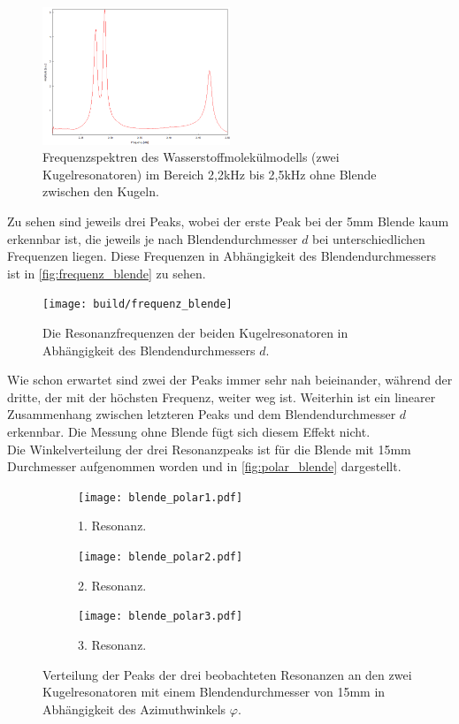 \begin{figure}
    \centering
    \includegraphics[width=0.5\textwidth]{data/3_1/ohne.png}
    \caption{Frequenzspektren des Wasserstoffmolekülmodells (zwei Kugelresonatoren) im Bereich 2,2\;kHz bis 2,5\;kHz ohne Blende zwischen den Kugeln.}
    \label{fig:ohne}
\end{figure}
Zu sehen sind jeweils drei Peaks, wobei der erste Peak bei der 5\;mm Blende kaum erkennbar ist, 
die jeweils je nach Blendendurchmesser $d$ bei unterschiedlichen Frequenzen liegen. Diese Frequenzen
in Abhängigkeit des Blendendurchmessers ist in \autoref{fig:frequenz_blende} zu sehen.
\begin{figure}
    \centering
    \texttt{[image: build/frequenz\_blende]}
    \caption{Die Resonanzfrequenzen der beiden Kugelresonatoren in Abhängigkeit des Blendendurchmessers $d$.}
    \label{fig:frequenz_blende}
\end{figure} 
Wie schon erwartet sind zwei der Peaks immer sehr nah beieinander, während der dritte, der mit
der höchsten Frequenz, weiter weg ist. Weiterhin ist ein linearer Zusammenhang zwischen
letzteren Peaks und dem Blendendurchmesser $d$ erkennbar. Die Messung ohne Blende fügt sich
diesem Effekt nicht. \\
Die Winkelverteilung der drei Resonanzpeaks ist für die Blende mit 15\;mm Durchmesser aufgenommen worden 
und in \autoref{fig:polar_blende} dargestellt.
\begin{figure}[hp]
    \centering
    \begin{subfigure}[b]{0.48\textwidth}
        \centering
        \texttt{[image: blende\_polar1.pdf]}
        \caption{1. Resonanz.}
    \end{subfigure}
    \hfill
    \begin{subfigure}[b]{0.48\textwidth}
        \centering
        \texttt{[image: blende\_polar2.pdf]}
        \caption{2. Resonanz.}
    \end{subfigure}
    \hfill
    \begin{subfigure}[b]{0.48\textwidth}
        \centering
        \texttt{[image: blende\_polar3.pdf]}
        \caption{3. Resonanz.}
    \end{subfigure}
    \hfill
    \caption{Verteilung der Peaks der drei beobachteten Resonanzen an den zwei Kugelresonatoren mit einem Blendendurchmesser von 15\;mm  in Abhängigkeit des Azimuthwinkels $\varphi$.}
    \label{fig:polar_blende}
\end{figure}
